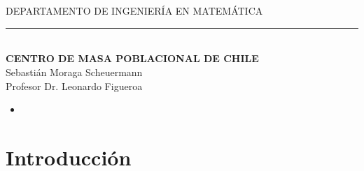 \documentclass[20pt]{report}
\begin{document}
\begin{center}
\\
\\

{DEPARTAMENTO DE INGENIER\'IA EN MATEM\'ATICA}
\end{center}
\begin{center}
\noindent\rule{15cm}{.5pt}\\
\vspace{2cm}
\textbf{\Large{ CENTRO DE MASA POBLACIONAL DE CHILE}}\\

\Large{Sebasti\'an Moraga Scheuermann}\\

\Large{Profesor Dr. Leonardo Figueroa}\\

\end{center}



 \vspace{.2cm}
  \noindent
\begin{itemize}
\item [\bf ]{\bf    }
\topmargin=-1.6cm


\end{itemize}
\topmargin=-1.6cm
\vspace{3cm}
\noindent 






\pagebreak


 \tableofcontents %


\chapter{Introducci\'on}\label{cap.introduccion}
\end{document}
